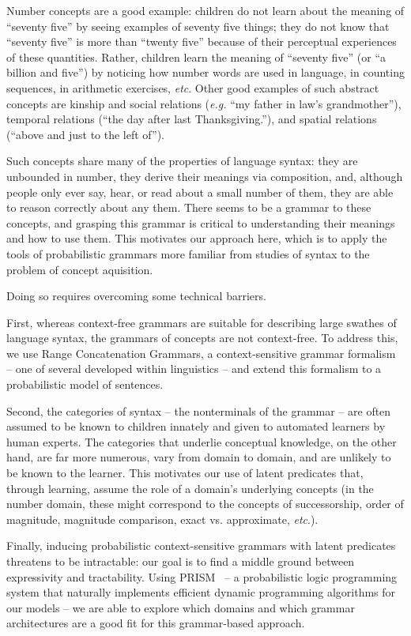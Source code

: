 \documentclass[10pt, twocolumn]{article}
\begin{document}
Number concepts are a good example: children do not learn about the
meaning of ``seventy five'' by seeing examples of seventy five things;
they do not know that ``seventy five'' is more than ``twenty five''
because of their perceptual experiences of these quantities. Rather,
children learn the meaning of ``seventy five'' (or ``a billion and
five'') by noticing how number words are used in language, in counting
sequences, in arithmetic exercises, {\it etc}. Other good examples of such
abstract concepts are kinship and social relations ({\it e.g.} ``my father
in law's grandmother''), temporal relations (``the day after last
Thanksgiving.''), and spatial relations (``above and just to the left
of'').

Such concepts share many of the properties of
language syntax: they are unbounded in number, they derive
their meanings via composition, and, although people only ever say,
hear, or read about a small number of them, they are able to reason
correctly about any them. There seems to be a grammar to these
concepts, and grasping this grammar is critical to understanding their
meanings and how to use them. This motivates our approach here, which
is to apply the tools of probabilistic grammars more familiar from
studies of syntax to the problem of concept aquisition.

Doing so requires overcoming some technical barriers.

First, whereas context-free grammars are suitable for describing large
swathes of language syntax, the grammars of concepts are not
context-free. To address this, we use Range Concatenation Grammars, a
context-sensitive grammar formalism -- one of several developed within
linguistics -- and extend this formalism to a probabilistic model of
sentences. 

Second, the categories of syntax -- the nonterminals of the grammar --
are often assumed to be known to children innately and given to
automated learners by human experts. The categories that underlie
conceptual knowledge, on the other hand, are far more numerous, vary
from domain to domain, and are unlikely to be known to the
learner. This motivates our use of latent predicates that, through
learning, assume the role of a domain's underlying concepts (in the
number domain, these might correspond to the concepts of
successorship, order of magnitude, magnitude comparison, exact
vs. approximate, {\it etc}.).

Finally, inducing probabilistic context-sensitive grammars with latent
predicates threatens to be intractable: our goal is to find a
middle ground between expressivity and tractability. Using
PRISM~\cite{DBLP:journals/jair/SatoK01} -- a probabilistic logic programming system that naturally
implements efficient dynamic programming algorithms for our models --
we are able to explore which domains and which grammar architectures
are a good fit for this grammar-based approach.
\end{document}
